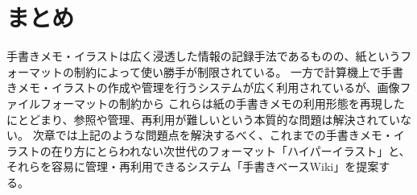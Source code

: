 \section{まとめ}
手書きメモ・イラストは広く浸透した情報の記録手法であるものの、紙というフォーマットの制約によって使い勝手が制限されている。
一方で計算機上で手書きメモ・イラストの作成や管理を行うシステムが広く利用されているが、画像ファイルフォーマットの制約から
これらは紙の手書きメモの利用形態を再現したにとどまり、参照や管理、再利用が難しいという本質的な問題は解決されていない。
次章では上記のような問題点を解決するべく、これまでの手書きメモ・イラストの在り方にとらわれない次世代のフォーマット「ハイパーイラスト」と、
それらを容易に管理・再利用できるシステム「手書きベースWiki」を提案する。